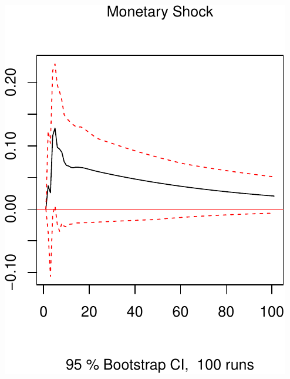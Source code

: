 \documentclass[11pt,preprint, authoryear]{elsarticle}
\numberwithin{equation}{section}
\numberwithin{figure}{section}
\numberwithin{table}{section}
\begin{document}
\includegraphics{TS_proj_files/figure-latex/unnamed-chunk-41-3.pdf}


\end{document}
